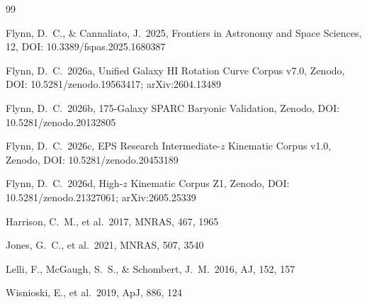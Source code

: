\documentclass[a4paper,12pt]{article}
\begin{document}

\begin{thebibliography}{99}

Flynn, D.~C., \& Cannaliato, J.\ 2025, Frontiers in Astronomy and Space
Sciences, 12, DOI: 10.3389/fspas.2025.1680387

Flynn, D.~C.\ 2026a, Unified Galaxy HI Rotation Curve Corpus v7.0,
Zenodo, DOI: 10.5281/zenodo.19563417; arXiv:2604.13489

Flynn, D.~C.\ 2026b, 175-Galaxy SPARC Baryonic Validation,
Zenodo, DOI: 10.5281/zenodo.20132805

Flynn, D.~C.\ 2026c, EPS Research Intermediate-$z$ Kinematic Corpus v1.0,
Zenodo, DOI: 10.5281/zenodo.20453189

Flynn, D.~C.\ 2026d, High-$z$ Kinematic Corpus Z1,
Zenodo, DOI: 10.5281/zenodo.21327061; arXiv:2605.25339

Harrison, C.~M., et al.\ 2017, MNRAS, 467, 1965

Jones, G.~C., et al.\ 2021, MNRAS, 507, 3540

Lelli, F., McGaugh, S.~S., \& Schombert, J.~M.\ 2016, AJ, 152, 157

Wisnioski, E., et al.\ 2019, ApJ, 886, 124

\end{thebibliography}
\end{document}
